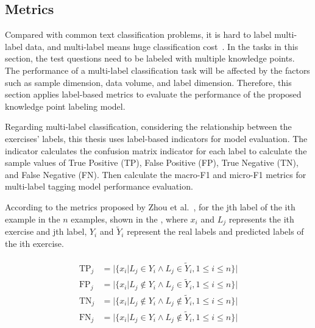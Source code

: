 \subsection{Metrics}
Compared with common text classification problems, it is hard to label multi-label data, and multi-label means huge classification cost~\cite{zhang2013review}. In the tasks in this section, the test questions need to be labeled with multiple knowledge points. The performance of a multi-label classification task will be affected by the factors such as sample dimension, data volume, and label dimension. Therefore, this section applies label-based metrics to evaluate the performance of the proposed knowledge point labeling model.


Regarding multi-label classification, considering the relationship between the exercises' labels, this thesis uses label-based indicators for model evaluation. The indicator calculates the confusion matrix indicator for each label to calculate the sample values of True Positive (TP), False Positive (FP), True Negative (TN), and False Negative (FN). Then calculate the macro-F1 and micro-F1 metrics for multi-label tagging model performance evaluation.

According to the metrics proposed by Zhou et al.~\cite{zhang2013review}, for the jth label of the ith example in the \(n\) examples, shown in the \eqname{\ref{fml:mlcm}}, where \(x_i\) and \(L_j\) represents the ith exercise and jth label, \(Y_i\) and \(\tilde{Y}_i\) represent the real labels and predicted labels of the ith exercise.

\begin{align}\label{fml:mlcm}
    \begin{split}
        \operatorname{TP}_j & =| \{x_i| L_j\in Y_{i}\wedge L_j \in \tilde{Y}_i , 1\leq i \leq n\}|       \\
        \operatorname{FP}_j & =| \{x_i| L_j\notin Y_{i}\wedge L_j \in \tilde{Y}_i , 1\leq i \leq n\}|    \\
        \operatorname{TN}_j & =| \{x_i| L_j\notin Y_{i}\wedge L_j \notin \tilde{Y}_i , 1\leq i \leq n\}| \\
        \operatorname{FN}_j & =| \{x_i| L_j\in Y_{i}\wedge L_j \notin \tilde{Y}_i , 1\leq i \leq n\}|
    \end{split}
\end{align}

